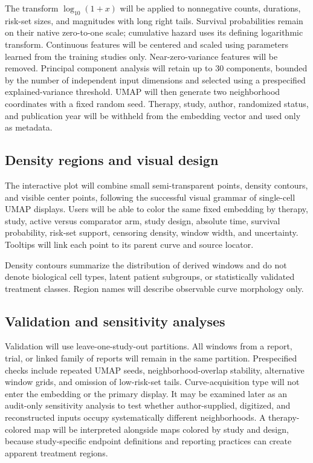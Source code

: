 \documentclass[17pt]{extarticle}
\begin{document}
The transform $\log_{10}(1+x)$ will be applied to nonnegative counts, durations, risk-set sizes, and magnitudes with long right tails. Survival probabilities remain on their native zero-to-one scale; cumulative hazard uses its defining logarithmic transform. Continuous features will be centered and scaled using parameters learned from the training studies only. Near-zero-variance features will be removed. Principal component analysis will retain up to 30 components, bounded by the number of independent input dimensions and selected using a prespecified explained-variance threshold. UMAP will then generate two neighborhood coordinates with a fixed random seed. Therapy, study, author, randomized status, and publication year will be withheld from the embedding vector and used only as metadata.

\subsection{Density regions and visual design}

The interactive plot will combine small semi-transparent points, density contours, and visible center points, following the successful visual grammar of single-cell UMAP displays. Users will be able to color the same fixed embedding by therapy, study, active versus comparator arm, study design, absolute time, survival probability, risk-set support, censoring density, window width, and uncertainty. Tooltips will link each point to its parent curve and source locator.

Density contours summarize the distribution of derived windows and do not denote biological cell types, latent patient subgroups, or statistically validated treatment classes. Region names will describe observable curve morphology only.

\subsection{Validation and sensitivity analyses}

Validation will use leave-one-study-out partitions. All windows from a report, trial, or linked family of reports will remain in the same partition. Prespecified checks include repeated UMAP seeds, neighborhood-overlap stability, alternative window grids, and omission of low-risk-set tails. Curve-acquisition type will not enter the embedding or the primary display. It may be examined later as an audit-only sensitivity analysis to test whether author-supplied, digitized, and reconstructed inputs occupy systematically different neighborhoods. A therapy-colored map will be interpreted alongside maps colored by study and design, because study-specific endpoint definitions and reporting practices can create apparent treatment regions.
\end{document}

